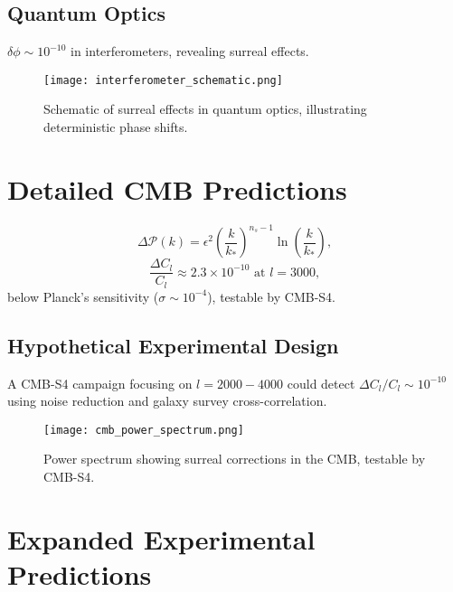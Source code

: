 \documentclass{article}
\begin{document}
\subsection{Quantum Optics}
\(\delta \phi \sim 10^{-10}\) in interferometers, revealing surreal effects.

\begin{figure}[h]
    \centering
    \texttt{[image: interferometer\_schematic.png]}
    \caption{Schematic of surreal effects in quantum optics, illustrating deterministic phase shifts.}
    \label{fig:interferometer}
\end{figure}

\section{Detailed CMB Predictions}
\begin{equation}
\Delta \mathcal{P}(k) = \epsilon^2 \left( \frac{k}{k_*} \right)^{n_s-1} \ln \left( \frac{k}{k_*} \right),
\end{equation}
\begin{equation}
\frac{\Delta C_l}{C_l} \approx 2.3 \times 10^{-10} \text{ at } l = 3000,
\end{equation}
below Planck's sensitivity (\(\sigma \sim 10^{-4}\)), testable by CMB-S4.

\subsection{Hypothetical Experimental Design}
A CMB-S4 campaign focusing on \(l = 2000-4000\) could detect \(\Delta C_l / C_l \sim 10^{-10}\) using noise reduction and galaxy survey cross-correlation.

\begin{figure}[h]
    \centering
    \texttt{[image: cmb\_power\_spectrum.png]}
    \caption{Power spectrum showing surreal corrections in the CMB, testable by CMB-S4.}
    \label{fig:cmb_spectrum}
\end{figure}

\section{Expanded Experimental Predictions}
\end{document}
